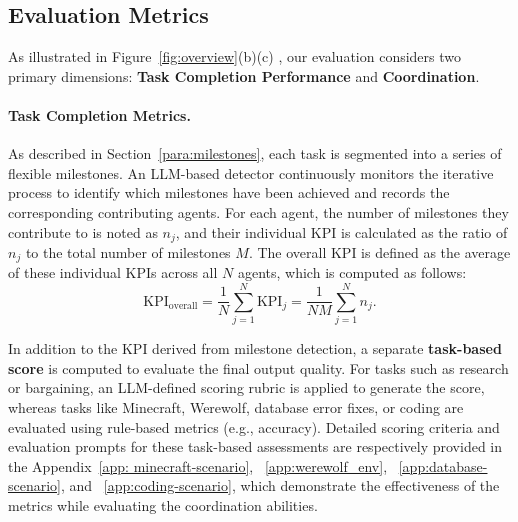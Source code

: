 \subsection{Evaluation Metrics}
\label{sec:eval_metrics}
As illustrated in Figure~\ref{fig:overview}(b)(c) , our evaluation considers two primary dimensions: \textbf{Task Completion Performance} and \textbf{Coordination}.

\paragraph{Task Completion Metrics.}  

As described in Section~\ref{para:milestones}, each task is segmented into a series of flexible milestones. An LLM-based detector continuously monitors the iterative process to identify which milestones have been achieved and records the corresponding contributing agents. For each agent, the number of milestones they contribute to is noted as \(n_j\), and their individual KPI is calculated as the ratio of \(n_j\) to the total number of milestones \(M\). The overall KPI is defined as the average of these individual KPIs across all \(N\) agents, which is computed as follows:
\[
\text{KPI}_{\text{overall}} = \frac{1}{N}\sum_{j=1}^{N}\text{KPI}_j = \frac{1}{NM}\sum_{j=1}^{N} n_j.
\]

In addition to the KPI derived from milestone detection, a separate \textbf{task-based score} is computed to evaluate the final output quality. For tasks such as research or bargaining, an LLM-defined scoring rubric is applied to generate the score, whereas tasks like Minecraft, Werewolf, database error fixes, or coding are evaluated using rule-based metrics (e.g., accuracy). Detailed scoring criteria and evaluation prompts for these task-based assessments are respectively provided in the Appendix~\ref{app: minecraft-scenario}, ~\ref{app:werewolf_env}, ~\ref{app:database-scenario}, and ~\ref{app:coding-scenario}, which demonstrate the effectiveness of the metrics while evaluating the coordination abilities.

